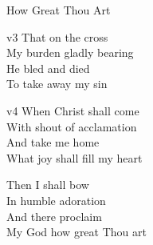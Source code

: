 \begin{song}{How Great Thou Art}
\begin{songframe}{v3}
        That on the cross \\
        My burden gladly bearing \\
        He bled and died \\
        To take away my sin
    \end{songframe}

    \begin{songframe}{v4}
        When Christ shall come \\
        With shout of acclamation \\
        And take me home \\
        What joy shall fill my heart

        Then I shall bow \\
        In humble adoration \\
        And there proclaim \\
        My God how great Thou art
    \end{songframe}

\end{song}
